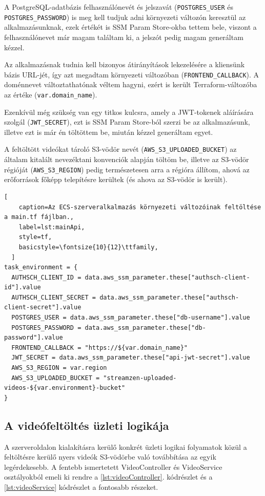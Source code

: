 A PostgreSQL-adatbázis felhasználónevét és jelszavát (\verb|POSTGRES_USER| és \verb|POSTGRES_PASSWORD|) is meg kell tudjuk adni környezeti változón keresztül az alkalmazásunknak, ezek értékét is SSM Param Store-okba tettem bele, viszont a felhasználónevet már magam találtam ki, a jelszót pedig magam generáltam kézzel.

Az alkalmazásnak tudnia kell bizonyos átirányítások lekezelésére a kliensünk bázis URL-jét, így azt megadtam környezeti változóban (\verb|FRONTEND_CALLBACK|). A doménnevet változtathatónak véltem hagyni, ezért is került Terraform-változóba az értéke (\verb|var.domain_name|).

Ezenkívül még szükség van egy titkos kulcsra, amely a JWT-tokenek aláírására szolgál (\verb|JWT_SECRET|), ezt is SSM Param Store-ból szerzi be az alkalmazásunk, illetve ezt is már én töltöttem be, miután kézzel generáltam egyet.

A feltöltött videókat tároló S3-vödör nevét (\verb|AWS_S3_UPLOADED_BUCKET|) az általam kitalált nevezéktani konvenciók alapján töltöm be, illetve az S3-vödör régióját (\verb|AWS_S3_REGION|) pedig természetesen arra a régióra állítom, ahová az erőforrások főképp telepítésre kerültek (és ahova az S3-vödör is került).

\begin{minipage}{0.92\textwidth}
  \begin{lstlisting}[
    caption=Az ECS-szerveralkalmazás környezeti változóinak feltöltése a main.tf fájlban.,
    label=lst:mainApi,
    style=tf,
    basicstyle=\fontsize{10}{12}\ttfamily,
  ]
task_environment = {
  AUTHSCH_CLIENT_ID = data.aws_ssm_parameter.these["authsch-client-id"].value
  AUTHSCH_CLIENT_SECRET = data.aws_ssm_parameter.these["authsch-client-secret"].value
  POSTGRES_USER = data.aws_ssm_parameter.these["db-username"].value
  POSTGRES_PASSWORD = data.aws_ssm_parameter.these["db-password"].value
  FRONTEND_CALLBACK = "https://${var.domain_name}"
  JWT_SECRET = data.aws_ssm_parameter.these["api-jwt-secret"].value
  AWS_S3_REGION = var.region
  AWS_S3_UPLOADED_BUCKET = "streamzen-uploaded-videos-${var.environment}-bucket"
}
\end{lstlisting}
\end{minipage}

\subsection{A videófeltöltés üzleti logikája}

A szerveroldalon kialakításra kerülő konkrét üzleti logikai folyamatok közül a feltöltésre kerülő nyers videók S3-vödörbe való továbbítása az egyik legérdekesebb. A fentebb ismertetett VideoController és VideoService osztályokból emeli ki rendre a \ref{lst:videoController}. kódrészlet és a \ref{lst:videoService} kódrészlet a fontosabb részeket.

